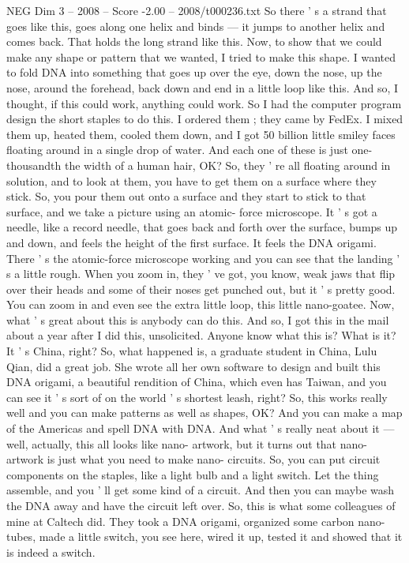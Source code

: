 \begin{textsample}{NEG Dim 3 – 2008 – Score -2.00 – 2008/t000236.txt}
So there ' s a strand that goes like this, goes along one helix and binds — it jumps to another helix and comes back.
That holds the long strand like this.
Now, to show that we could make any shape or pattern that we wanted, I tried to make this shape.
I wanted to fold DNA into something that goes up over the eye, down the nose, up the nose, around the forehead, back down and end in a little loop like this.
And so, I thought, if this could work, anything could work.
So I had the computer program design the short staples to do this.
I ordered them ; they came by FedEx.
I mixed them up, heated them, cooled them down, and I got 50 billion little smiley faces floating around in a single drop of water.
And each one of these is just one-thousandth the width of a human hair, OK?
So, they ' re all floating around in solution, and to look at them, you have to get them on a surface where they stick.
So, you pour them out onto a surface and they start to stick to that surface, and we take a picture using an atomic- force microscope.
It ' s got a needle, like a record needle, that goes back and forth over the surface, bumps up and down, and feels the height of the first surface.
It feels the DNA origami.
There ' s the atomic-force microscope working and you can see that the landing ' s a little rough.
When you zoom in, they ' ve got, you know, weak jaws that flip over their heads and some of their noses get punched out, but it ' s pretty good.
You can zoom in and even see the extra little loop, this little nano-goatee.
Now, what ' s great about this is anybody can do this.
And so, I got this in the mail about a year after I did this, unsolicited.
Anyone know what this is?
What is it?
It ' s China, right?
So, what happened is, a graduate student in China, Lulu Qian, did a great job.
She wrote all her own software to design and built this DNA origami, a beautiful rendition of China, which even has Taiwan, and you can see it ' s sort of on the world ' s shortest leash, right?
So, this works really well and you can make patterns as well as shapes, OK?
And you can make a map of the Americas and spell DNA with DNA.
And what ' s really neat about it — well, actually, this all looks like nano- artwork, but it turns out that nano-artwork is just what you need to make nano- circuits.
So, you can put circuit components on the staples, like a light bulb and a light switch.
Let the thing assemble, and you ' ll get some kind of a circuit.
And then you can maybe wash the DNA away and have the circuit left over.
So, this is what some colleagues of mine at Caltech did.
They took a DNA origami, organized some carbon nano-tubes, made a little switch, you see here, wired it up, tested it and showed that it is indeed a switch.

\end{textsample}
